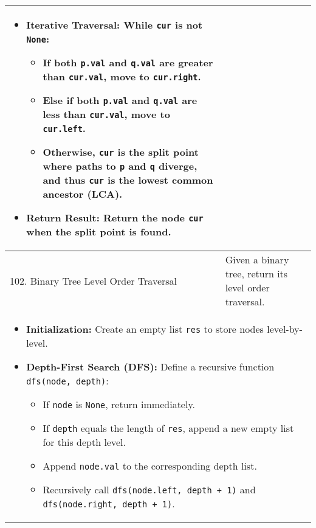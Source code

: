 \begin{summary}
\begin{center}
\begin{tabular}{ll}
{\begin{itemize}
                    \item \textbf{Iterative Traversal:} While \texttt{cur} is not \texttt{None}:
                        \begin{itemize}
                            \item If both \texttt{p.val} and \texttt{q.val} are greater than \texttt{cur.val}, move to \texttt{cur.right}.
                            \item Else if both \texttt{p.val} and \texttt{q.val} are less than \texttt{cur.val}, move to \texttt{cur.left}.
                            \item Otherwise, \texttt{cur} is the split point where paths to \texttt{p} and \texttt{q} diverge, and thus \texttt{cur} is the lowest common ancestor (LCA).
                        \end{itemize}
                
                    \item \textbf{Return Result:} Return the node \texttt{cur} when the split point is found.
                \end{itemize}                
            } \\
            \midrule
            102. Binary Tree Level Order Traversal & Given a binary tree, return its level order traversal. \\
            \multicolumn{2}{p{\linewidth}}{
                \begin{itemize}
                    \item \textbf{Initialization:} Create an empty list \texttt{res} to store nodes level-by-level.
                
                    \item \textbf{Depth-First Search (DFS):} Define a recursive function \texttt{dfs(node, depth)}:
                        \begin{itemize}
                            \item If \texttt{node} is \texttt{None}, return immediately.
                            \item If \texttt{depth} equals the length of \texttt{res}, append a new empty list for this depth level.
                            \item Append \texttt{node.val} to the corresponding depth list.
                            \item Recursively call \texttt{dfs(node.left, depth + 1)} and \texttt{dfs(node.right, depth + 1)}.
                        \end{itemize}
                

\end{itemize}}
\end{tabular}
\end{center}
\end{summary}
